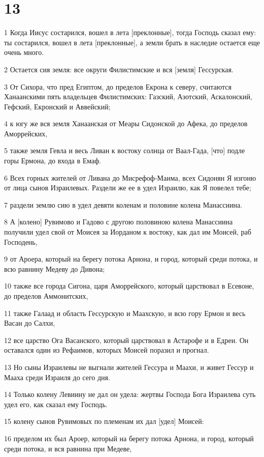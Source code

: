 \chapter{13}

\par 1 Когда Иисус состарился, вошел в лета [преклонные], тогда Господь сказал ему: ты состарился, вошел в лета [преклонные], а земли брать в наследие остается еще очень много.
\par 2 Остается сия земля: все округи Филистимские и вся [земля] Гессурская.
\par 3 От Сихора, что пред Египтом, до пределов Екрона к северу, считаются Ханаанскими пять владельцев Филистимских: Газский, Азотский, Аскалонский, Гефский, Екронский и Аввейский;
\par 4 к югу же вся земля Ханаанская от Меары Сидонской до Афека, до пределов Аморрейских,
\par 5 также земля Гевла и весь Ливан к востоку солнца от Ваал-Гада, [что] подле горы Ермона, до входа в Емаф.
\par 6 Всех горных жителей от Ливана до Мисрефоф-Маима, всех Сидонян Я изгоню от лица сынов Израилевых. Раздели же ее в удел Израилю, как Я повелел тебе;
\par 7 раздели землю сию в удел девяти коленам и половине колена Манассиина.
\par 8 А [колено] Рувимово и Гадово с другою половиною колена Манассиина получили удел свой от Моисея за Иорданом к востоку, как дал им Моисей, раб Господень,
\par 9 от Ароера, который на берегу потока Арнона, и город, который среди потока, и всю равнину Медеву до Дивона;
\par 10 также все города Сигона, царя Аморрейского, который царствовал в Есевоне, до пределов Аммонитских,
\par 11 также Галаад и область Гессурскую и Маахскую, и всю гору Ермон и весь Васан до Салхи,
\par 12 все царство Ога Васанского, который царствовал в Астарофе и в Едреи. Он оставался один из Рефаимов, которых Моисей поразил и прогнал.
\par 13 Но сыны Израилевы не выгнали жителей Гессура и Маахи, и живет Гессур и Мааха среди Израиля до сего дня.
\par 14 Только колену Левиину не дал он удела: жертвы Господа Бога Израилева суть удел его, как сказал ему Господь.
\par 15 колену сынов Рувимовых по племенам их дал [удел] Моисей:
\par 16 пределом их был Ароер, который на берегу потока Арнона, и город, который среди потока, и вся равнина при Медеве,

